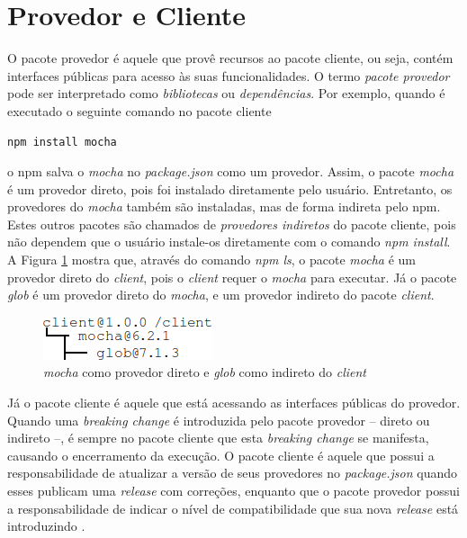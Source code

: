 \section{Provedor e Cliente}
\label{ref-teo:prov_clie}
O pacote provedor é aquele que provê recursos ao pacote cliente, ou seja, contém interfaces públicas para acesso às suas funcionalidades. O termo \textit{pacote provedor} pode ser interpretado como \textit{bibliotecas} ou \textit{dependências}. Por exemplo, quando é executado o seguinte comando no pacote cliente

\begin{lstlisting}[style=bash, label=cod:install:provider]
npm install mocha
\end{lstlisting}
o \gls{npm} salva o \textit{mocha} no \textit{package.json} como um provedor. Assim, o pacote \textit{mocha} é um provedor direto, pois foi instalado diretamente pelo usuário. Entretanto, os provedores do \textit{mocha} também são instaladas, mas de forma indireta pelo \gls{npm}. Estes outros pacotes são chamados de \textit{provedores indiretos} do pacote cliente, pois não dependem que o usuário instale-os diretamente com o comando \textit{npm install}. A Figura \ref{fig:provider} mostra que, através do comando \textit{npm ls}, o pacote \textit{mocha} é um provedor direto do \textit{client}, pois o \textit{client} requer o \textit{mocha} para executar. Já o pacote \textit{glob} é um provedor direto do \textit{mocha}, e um provedor indireto do pacote \textit{client}.

\begin{figure}
    \centering
    \includegraphics{figuras/provider_directly_undirectly.png}
    \caption{\textit{mocha} como provedor direto e \textit{glob} como indireto do \textit{client}}
    \label{fig:provider}
\end{figure}{}

Já o pacote cliente é aquele que está acessando as interfaces públicas do provedor. Quando uma \textit{breaking change} é introduzida pelo pacote provedor -- direto ou indireto --, é sempre no pacote cliente que esta \textit{breaking change} se manifesta, causando o encerramento da execução. O pacote cliente é aquele que possui a responsabilidade de atualizar a versão de seus provedores no \textit{package.json} quando esses publicam uma \textit{release} com correções, enquanto que o pacote provedor possui a responsabilidade de indicar o nível de compatibilidade que sua nova \textit{release} está introduzindo \cite{teorical_reference:semver}.

